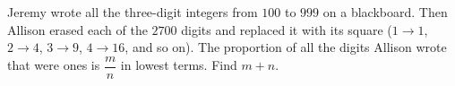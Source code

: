 Jeremy wrote all the three-digit integers from $100$ to $999$ on a blackboard. Then Allison erased each of the $2700$ digits and replaced it with its square ($1\to1$, $2\to4$, $3\to9$, $4\to16$, and so on). The proportion of all the digits Allison wrote that were ones is $\dfrac {m}{n}$ in lowest terms. Find $m+n$.
